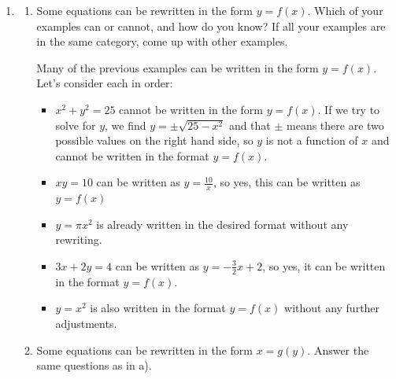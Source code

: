 \documentclass[main]{subfiles}
\begin{document}
\begin{enumerate}
\begin{solution}
\end{solution}

\item 
\begin{enumerate}

\item 
\begin{problem}
Some equations can be rewritten in the form $y=f(x)$. Which of your examples can or cannot, and how do you know? If all your examples are in the same category, come up with other examples. 
\end{problem}
\pspace{\vfill}
\begin{solution}
    Many of the previous examples can be written in the form $y=f(x)$. Let's consider each in order:
    \begin{itemize}
        \item $x^2+y^2=25$ cannot be written in the form $y=f(x)$. If we try to solve for $y$, we find $y=\pm \sqrt{25-x^2}$ and that $\pm$ means there are two possible values on the right hand side, so $y$ is not a function of $x$ and cannot be written in the format $y=f(x)$.
        \item $xy=10$ can be written as $y=\frac{10}{x}$, so yes, this can be written as $y=f(x)$
        \item $y=\pi x^2$ is already written in the desired format without any rewriting.
        \item $3x+2y=4$ can be written as $y=-\frac{3}{2}x+2$, so yes, it can be written in the format $y=f(x)$.
        \item $y=x^2$ is also written in the format $y=f(x)$ without any further adjustments.
    \end{itemize}
\end{solution}

\item 
\begin{problem}
Some equations can be rewritten in the form $x=g(y)$. Answer the same questions as in a).
\end{problem}
\pspace{\vfill}


\end{enumerate}
\end{enumerate}
\end{document}
